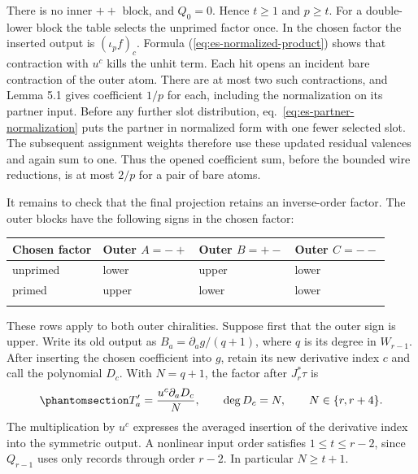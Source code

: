 \documentclass[
  english,
  11pt,
  reqno]{amsart}
\begin{document}
There is no inner \(++\) block, and \(Q_0=0\). Hence \(t\ge1\) and
\(p\ge t\). For a double-lower block the table selects the unprimed
factor once. In the chosen factor the inserted output is
\((\iota_pf)_c\). Formula (\ref{eq:es-normalized-product}) shows that
contraction with \(u^c\) kills the unhit term. Each hit opens an
incident bare contraction of the outer atom. There are at most two such
contractions, and Lemma 5.1 gives coefficient \(1/p\) for each,
including the normalization on its partner input. Before any further
slot distribution, eq.~\ref{eq:es-partner-normalization} puts the
partner in normalized form with one fewer selected slot. The subsequent
assignment weights therefore use these updated residual valences and
again sum to one. Thus the opened coefficient sum, before the bounded
wire reductions, is at most \(2/p\) for a pair of bare atoms.

It remains to check that the final projection retains an inverse-order
factor. The outer blocks have the following signs in the chosen factor:

\begin{center}
\begin{tabular}{@{}llll@{}}
\toprule\noalign{}
Chosen factor & Outer \(A=-+\) & Outer \(B=+-\) & Outer \(C=--\) \\
\midrule\noalign{}
unprimed & lower & upper & lower \\
primed & upper & lower & lower \\
\bottomrule\noalign{}
\end{tabular}
\end{center}

These rows apply to both outer chiralities. Suppose first that the outer
sign is upper. Write its old output as \(B_a=\partial_ag/(q+1)\), where
\(q\) is its degree in \(W_{r-1}\). After inserting the chosen
coefficient into \(g\), retain its new derivative index \(c\) and call
the polynomial \(D_c\). With \(N=q+1\), the factor after \(J_r^*\tau\)
is \begin{equation}\protect\phantomsection\label{eq:es-exact-slot-map}{
 T'_a=\frac{u^c\partial_aD_c}{N},\qquad
 \deg D_c=N,\qquad N\in\{r,r+4\}.
}\end{equation} The multiplication by \(u^c\) expresses the averaged
insertion of the derivative index into the symmetric output. A nonlinear
input order satisfies \(1\le t\le r-2\), since \(Q_{r-1}\) uses only
records through order \(r-2\). In particular \(N\ge t+1\).
\end{document}
